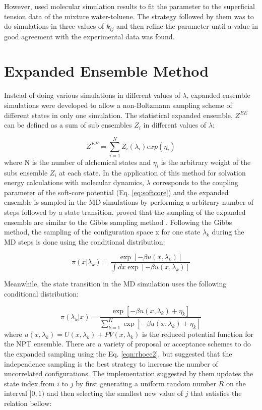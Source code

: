 However,  used molecular simulation results to fit the parameter to the superficial tension data of the mixture water-toluene. The strategy followed by them was to do simulations in three values of $k_{ij}$ and then refine the parameter until a value in good agreement with the experimental data was found. 




\section{Expanded Ensemble Method}\label{ee}

Instead of doing various simulations in different values of $\lambda$, expanded ensemble simulations \cite{lyubartsev} were developed to allow a non-Boltzmann sampling scheme of different states in only one simulation. The statistical expanded ensemble, $Z^{EE}$ can be defined as a sum of sub ensembles $Z_{i}$ in different values of $\lambda$:

\begin{equation}
Z^{EE} = \sum_{i=1}^{N} Z_{i}(\lambda_{i}) exp(\eta_{i})
\label{eqn:ee}
\end{equation}   
where N is the number of alchemical states and $\eta_{i}$ is the arbitrary weight of the subs ensemble $Z_{i}$ at each state. In the application of this method for solvation energy calculations with molecular dynamics, $\lambda$ corresponds to the coupling parameter of the soft-core potential (Eq. \ref{eq:softcore}) and the expanded ensemble is sampled in the MD simulations by performing a arbitrary number of steps followed by a state transition.  proved that the sampling of the expanded ensemble are similar to the Gibbs sampling method \cite{geman1984,liu2002}. Following the Gibbs method, the sampling of the configuration space x for one state $\lambda_{k}$ during the MD steps is done using the conditional distribution:

\begin{equation}
\pi(x|\lambda_{k}) = \dfrac{\exp[-\beta u(x,\lambda_{k})]}{\int dx \exp [- \beta u(x,\lambda_{k})]}
\label{eqn:rhoee1}
\end{equation} 

Meanwhile, the state transition in the MD simulation uses the following conditional distribution:

\begin{equation}
\pi(\lambda_{k}|x) = \dfrac{\exp[-\beta u(x,\lambda_{k}) + \eta_{k}]}{ \sum_{k=1}^{K} \exp [- \beta u(x,\lambda_{k})+ \eta_{k}]}
\label{eqn:rhoee2}
\end{equation} 
where $u(x,\lambda_{k}) = U(x,\lambda_{k}) + PV(x,\lambda_{k})$ is the reduced potential function for the NPT ensemble. There are a variety of proposal or acceptance schemes to do the expanded sampling using the Eq. \eqref{eqn:rhoee2}, but  suggested that the independence sampling \cite{liu2002} is the best strategy to increase the number of uncorrelated configurations. The implementation suggested by them updates the state index from $i$ to $j$ by first generating a uniform random number $R$ on the interval $[0,1)$ and then selecting the smallest new value of $j$ that satisfies  the relation bellow:

